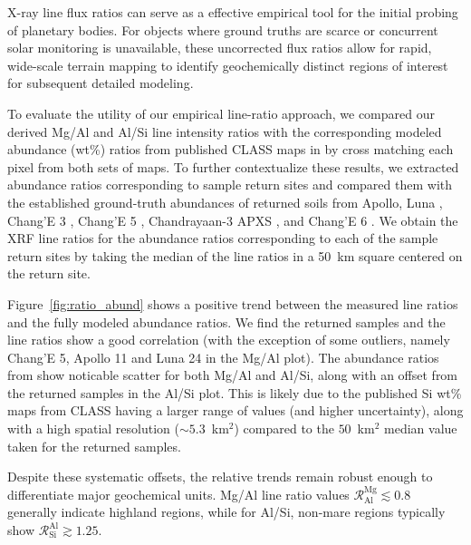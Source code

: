 \documentclass[twocolumn,linenumbers]{aastex631}
\newcommand{\revone}[1]{#1}
\begin{document}

\revone{X-ray line flux ratios can serve as a effective empirical tool for the initial probing of planetary bodies. For objects where ground truths are scarce or concurrent solar monitoring is unavailable, these uncorrected flux ratios allow for rapid, wide-scale terrain mapping to identify geochemically distinct regions of interest for subsequent detailed modeling.}

\revone{To evaluate the utility of our empirical line-ratio approach, we compared our derived Mg/Al and Al/Si line intensity ratios with the corresponding modeled abundance (wt\%) ratios from published CLASS maps in \citet{NARENDRANATH2024115898} by cross matching each pixel from both sets of maps. To further contextualize these results, we extracted abundance ratios corresponding to sample return sites and compared them with the established ground-truth abundances of returned soils from Apollo, Luna \citep{meyer2005lunar}, Chang'E 3 \citep{Ng2023}, Chang'E 5 \citep{Zong2022}, Chandrayaan-3 APXS \citep{Vadawale2024}, and Chang'E 6 \citep{10.1093/nsr/nwae328}. We obtain the XRF line ratios for the abundance ratios corresponding to each of the sample return sites by taking the median of the line ratios in a 50~km square centered on the return site.}

\revone{Figure~\ref{fig:ratio_abund} shows a positive trend between the measured line ratios and the fully modeled abundance ratios. We find the returned samples and the line ratios show a good correlation (with the exception of some outliers, namely Chang'E 5, Apollo 11 and Luna 24 in the Mg/Al plot). The abundance ratios from \citet{NARENDRANATH2024115898} show noticable scatter for both Mg/Al and Al/Si, along with an offset from the returned samples in the Al/Si plot. This is likely due to the published Si wt\% maps from CLASS having a larger range of values (and higher uncertainty), along with a high spatial resolution ($\sim5.3$~km$^2$) compared to the $50$~km$^2$ median value taken for the returned samples.}

\revone{Despite these systematic offsets, the relative trends remain robust enough to differentiate major geochemical units. Mg/Al line ratio values $\mathcal{R}^\text{Mg}_\text{Al} \lesssim 0.8$ generally indicate highland regions, while for Al/Si, non-mare regions typically show $\mathcal{R}^\text{Al}_\text{Si} \gtrsim 1.25$.}
\end{document}
